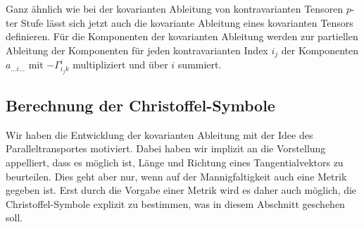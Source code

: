Ganz ähnlich wie bei der kovarianten Ableitung von kontravarianten
Tensoren $p$-ter Stufe lässt sich jetzt auch die kovariante
Ableitung eines kovarianten Tensors definieren.
Für die Komponenten der kovarianten Ableitung werden zur partiellen
Ableitung der Komponenten für jeden kontravarianten Index $i_j$ der
Komponenten $a_{\dots i\dots}$ mit $-\Gamma^{i}_{i_jk}$ multipliziert
und über $i$ summiert.

%
%
\subsection{Berechnung der Christoffel-Symbole
\label{buch:zusammenhang:subsection:christoffel}}
Wir haben die Entwicklung der kovarianten Ableitung mit der Idee des
Paralleltransportes motiviert.
Dabei haben wir implizit an die Vorstellung appelliert, dass es
möglich ist, Länge und Richtung eines Tangentialvektors zu beurteilen.
Dies geht aber nur, wenn auf der Mannigfaltigkeit auch eine Metrik
gegeben ist.
Erst durch die Vorgabe einer Metrik wird es daher auch möglich, die
Christoffel-Symbole explizit zu bestimmen, was in diesem Abschnitt
geschehen soll.

%
%

